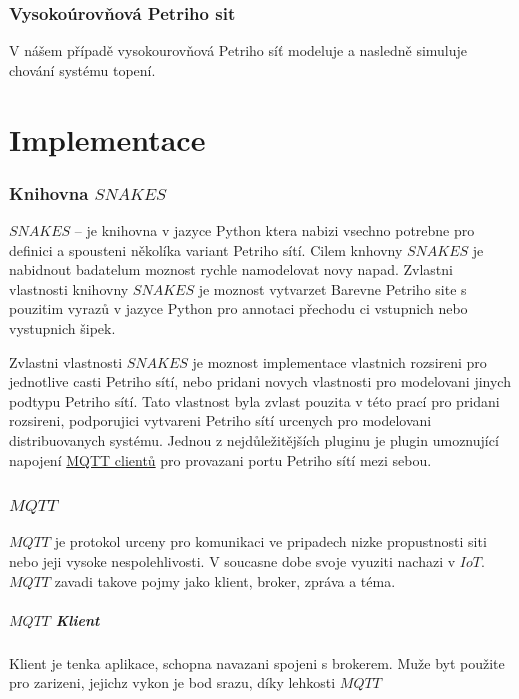 \subsection{Vysokoúrovňová Petriho sit}
V nášem případě vysokourovňová Petriho síť modeluje a nasledně simuluje chování systému topení.
\chapter{Implementace}
\label{sec:implementation}
\subsection{Knihovna $SNAKES$}
\href{https://www.ibisc.univ-evry.fr/~fpommereau/SNAKES/}{$SNAKES$} -- je knihovna v jazyce Python ktera nabizi vsechno potrebne pro definici a spousteni několíka variant Petriho sítí. Cilem knhovny $SNAKES$ je nabidnout badatelum moznost rychle namodelovat novy napad. Zvlastni vlastnosti knihovny $SNAKES$ je moznost vytvarzet Barevne Petriho site s pouzitim vyrazů v jazyce Python pro annotaci přechodu ci vstupnich nebo vystupnich šipek. \cite{snakes}

Zvlastni vlastnosti $SNAKES$ je moznost implementace vlastnich rozsireni pro jednotlive casti Petriho sítí, nebo pridani novych vlastnosti pro modelovani jinych podtypu Petriho sítí. Tato vlastnost byla zvlast pouzita v této prací pro pridani rozsireni, podporujici vytvareni Petriho sítí urcenych pro modelovani distribuovanych systému.
Jednou z nejdůležitějších pluginu je plugin umoznující napojení \hyperref[sec:aplikace-mqtt]{MQTT clientů} pro provazani portu Petriho sítí mezi sebou.

\subsection{$MQTT$}
\href{http://mqtt.org/}{$MQTT$} je protokol urceny pro komunikaci ve pripadech nizke propustnosti siti nebo jeji vysoke nespolehlivosti. V soucasne dobe svoje vyuziti nachazi v \href{https://en.wikipedia.org/wiki/Internet_of_things}{$IoT$}. $MQTT$ zavadi takove pojmy jako klient, broker, zpráva a téma.

\paragraph{$MQTT$ Klient}

Klient je tenka aplikace, schopna navazani spojeni s brokerem. Muže byt použite pro zarizeni, jejichz vykon je bod srazu, díky lehkosti $MQTT$

